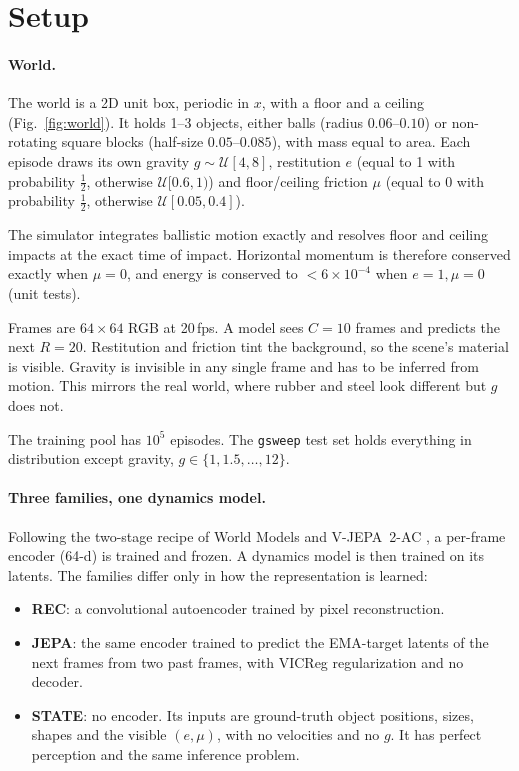 \section{Setup}
\label{sec:setup}

\paragraph{World.} The world is a 2D unit box, periodic in $x$, with a floor and a ceiling
(Fig.~\ref{fig:world}). It holds 1--3 objects, either balls (radius $0.06$--$0.10$) or non-rotating
square blocks (half-size $0.05$--$0.085$), with mass equal to area. Each episode draws its own
gravity $g\sim\mathcal U[4,8]$, restitution $e$ (equal to 1 with probability $\tfrac12$,
otherwise $\mathcal U[0.6,1)$) and floor/ceiling friction $\mu$ (equal to 0 with probability
$\tfrac12$, otherwise $\mathcal U[0.05,0.4]$).

The simulator integrates ballistic motion exactly and resolves floor and ceiling impacts at the
exact time of impact. Horizontal momentum is therefore conserved exactly when $\mu{=}0$, and energy
is conserved to $<6{\times}10^{-4}$ when $e{=}1,\mu{=}0$ (unit tests).

Frames are $64{\times}64$ RGB at 20\,fps. A model sees $C{=}10$ frames and predicts the next
$R{=}20$. Restitution and friction tint the background, so the scene's material is visible. Gravity
is invisible in any single frame and has to be inferred from motion. This mirrors the real world,
where rubber and steel look different but $g$ does not.

The training pool has $10^5$ episodes. The \texttt{gsweep} test set holds everything in
distribution except gravity, $g\in\{1,1.5,\dots,12\}$.

\paragraph{Three families, one dynamics model.} Following the two-stage recipe of World Models
\citep{ha2018world} and V-JEPA~2-AC \citep{assran2025vjepa2}, a per-frame encoder (64-d) is
trained and frozen. A dynamics model is then trained on its latents. The families differ only in
how the representation is learned:
\begin{itemize}
\item \textbf{REC}: a convolutional autoencoder trained by pixel reconstruction.
\item \textbf{JEPA}: the same encoder trained to predict the EMA-target latents of the next frames
from two past frames, with VICReg regularization \citep{bardes2022vicreg} and no decoder.
\item \textbf{STATE}: no encoder. Its inputs are ground-truth object positions, sizes, shapes and
the visible $(e,\mu)$, with no velocities and no $g$. It has perfect perception and the same
inference problem.
\end{itemize}

